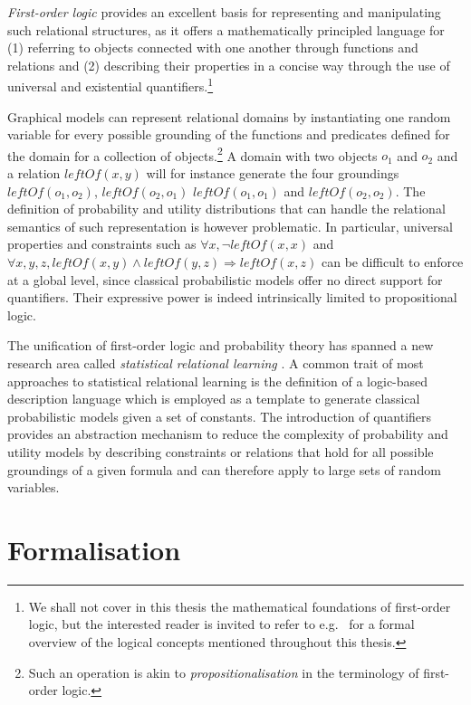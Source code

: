\textit{First-order logic} provides an excellent basis for representing and manipulating such relational structures, as it offers a mathematically principled language for (1) referring to objects connected with one another through functions and relations and (2) describing their properties in a concise way through the use of universal and existential quantifiers.\footnote{We shall not cover in this thesis the mathematical foundations of first-order logic, but the interested reader is invited to refer to e.g.\ \cite{gamut1991logic} for a formal overview of the logical concepts mentioned throughout this thesis.}

Graphical models can represent relational domains by instantiating one random variable for every possible grounding of the functions and predicates defined for the domain for a collection of objects.\footnote{Such an operation is akin to \textit{propositionalisation} in the terminology of first-order logic.}  A domain with two objects $o_1$ and $o_2$ and a relation $\mathit{leftOf}(x,y)$ will for instance generate the four groundings $\mathit{leftOf}(o_1,o_2)$, $\mathit{leftOf}(o_2,o_1)$ $\mathit{leftOf}(o_1,o_1)$ and $\mathit{leftOf}(o_2,o_2)$. The definition of probability and utility distributions that can handle the relational semantics of such representation is however problematic. In particular, universal properties and constraints such as $\forall x, \neg \mathit{leftOf}(x,x)$ and $\forall x, y, z, \mathit{leftOf}(x,y) \land \mathit{leftOf}(y,z) \Rightarrow \mathit{leftOf}(x,z)$ can be difficult to enforce at a global level, since classical probabilistic models offer no direct support for quantifiers.  Their expressive power is indeed intrinsically limited to propositional logic. 
 
The unification of first-order logic and probability theory has spanned a new research area called \textit{statistical relational learning} \citep{getoor:srlbook07}. A common trait of most approaches to statistical relational learning is the definition of a logic-based description language which is employed as a template to generate classical probabilistic models given a set of constants. The introduction of quantifiers provides an abstraction mechanism to reduce the complexity of probability and utility models by describing constraints or relations that hold for all possible groundings of a given formula and can therefore apply to large sets of random variables. 

\section{Formalisation}
\label{sec:formalisation}

